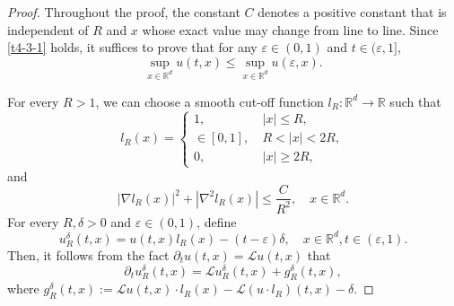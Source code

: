\documentclass[a4paper,11pt]{amsart}
\renewcommand{\le}{\leqslant}
\renewcommand{\ge}{\geqslant}
\newcommand{\R}{\mathds R}
\newcommand{\e}{ \varepsilon}
\def\LL{{\mathcal L}}
\theoremstyle{definition}
\begin{document}
\begin{proof}
Throughout the proof, the constant $C$ denotes a positive constant that is independent of $R$
and $x$  whose exact value may change from line to line. Since \eqref{t4-3-1} holds, it suffices to prove that
for any $\e \in (0,1)$ and $t\in (\e,1]$,
\begin{equation}\label{t4-3-5}
\sup_{x \in \R^d}u(t,x)\le \sup_{x \in \R^d}u(\e,x).
\end{equation}

For every $R>1$, we can choose a smooth cut-off function $l_R:\R^d \rightarrow \R$ such that
\begin{equation*}
l_R(x)=
\begin{cases}
1,\ \ \   & |x|\le R,\\
\in [0,1],\ & R<|x|<2R,\\
0,\ \ \  &|x|\ge 2R,
\end{cases}
\end{equation*} and
\begin{equation}\label{t4-3-6}
|\nabla l_R(x)|^2+|\nabla^2 l_R(x)|\le \frac{C}{R^2},\quad x\in \R^d.
\end{equation}
For every $R,\delta>0$ and $\e\in (0,1)$, define $$u_{R}^{\delta}(t,x)=
u(t,x)l_R(x)-(t-\e)\delta,\quad x\in \R^d, t\in (\e,1).$$ Then, it follows from the fact $\partial_t u(t,x)= \LL u(t,x)$ that
\begin{equation}\label{t4-3-3}
{\partial_t u_R^{\delta}(t,x)}=
\LL u_R^{\delta}(t,x)+g_R^{\delta}(t,x),
\end{equation}
where $g_R^{\delta}(t,x):= \LL u(t,x)\cdot l_R(x)-\LL(u\cdot l_R)(t,x)-\delta$.


\end{proof}
\end{document}
